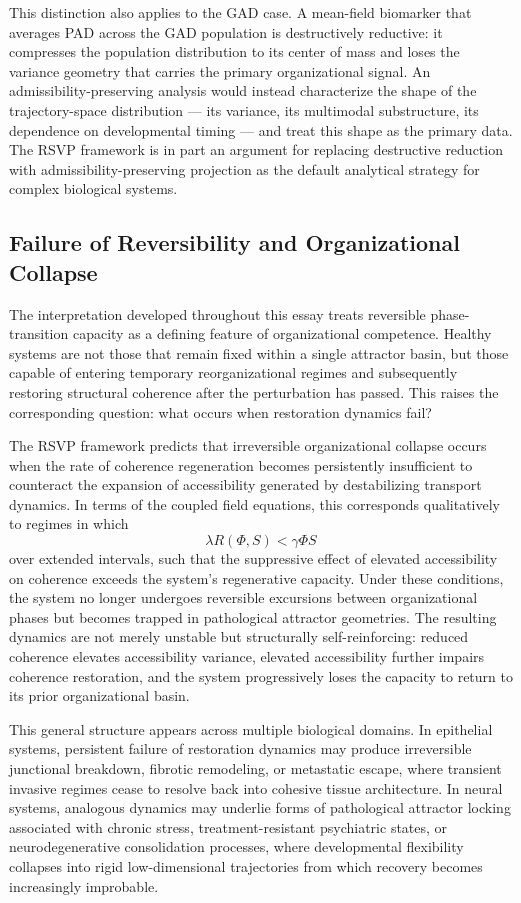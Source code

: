 \documentclass[11pt,a4paper]{article}
\theoremstyle{plain}
\theoremstyle{definition}
\begin{document}
This distinction also applies to the GAD case. A mean-field biomarker that averages
PAD across the GAD population is destructively reductive: it compresses the population
distribution to its center of mass and loses the variance geometry that carries the
primary organizational signal. An admissibility-preserving analysis would instead
characterize the shape of the trajectory-space distribution --- its variance, its
multimodal substructure, its dependence on developmental timing --- and treat this
shape as the primary data. The RSVP framework is in part an argument for replacing
destructive reduction with admissibility-preserving projection as the default
analytical strategy for complex biological systems.

\subsection{Failure of Reversibility and Organizational Collapse}

The interpretation developed throughout this essay treats reversible phase-transition
capacity as a defining feature of organizational competence. Healthy systems are not
those that remain fixed within a single attractor basin, but those capable of entering
temporary reorganizational regimes and subsequently restoring structural coherence after
the perturbation has passed. This raises the corresponding question: what occurs when
restoration dynamics fail?

The RSVP framework predicts that irreversible organizational collapse occurs when the
rate of coherence regeneration becomes persistently insufficient to counteract the
expansion of accessibility generated by destabilizing transport dynamics. In terms of
the coupled field equations, this corresponds qualitatively to regimes in which
\[
\lambda R(\Phi, S) < \gamma \Phi S
\]
over extended intervals, such that the suppressive effect of elevated accessibility on
coherence exceeds the system's regenerative capacity. Under these conditions, the system
no longer undergoes reversible excursions between organizational phases but becomes
trapped in pathological attractor geometries. The resulting dynamics are not merely
unstable but structurally self-reinforcing: reduced coherence elevates accessibility
variance, elevated accessibility further impairs coherence restoration, and the system
progressively loses the capacity to return to its prior organizational basin.

This general structure appears across multiple biological domains. In epithelial systems,
persistent failure of restoration dynamics may produce irreversible junctional breakdown,
fibrotic remodeling, or metastatic escape, where transient invasive regimes cease to
resolve back into cohesive tissue architecture. In neural systems, analogous dynamics
may underlie forms of pathological attractor locking associated with chronic stress,
treatment-resistant psychiatric states, or neurodegenerative consolidation processes,
where developmental flexibility collapses into rigid low-dimensional trajectories from
which recovery becomes increasingly improbable.
\end{document}
